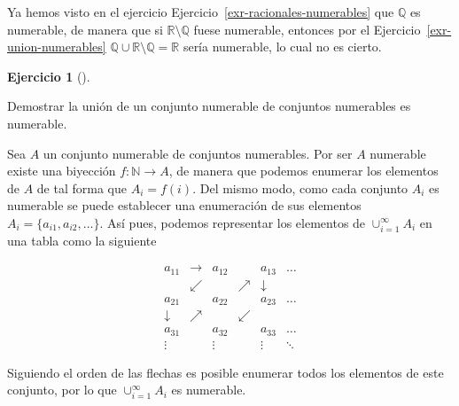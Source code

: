 \documentclass[
  spanish,
  a4paper,
]{scrreport}
\theoremstyle{definition}
\newtheorem{exercise}{Ejercicio}[chapter]
\theoremstyle{remark}
\begin{document}
\begin{tcolorbox}[enhanced jigsaw, arc=.35mm, bottomrule=.15mm, bottomtitle=1mm, breakable, colback=white, colbacktitle=quarto-callout-tip-color!10!white, colframe=quarto-callout-tip-color-frame, coltitle=black, left=2mm, leftrule=.75mm, opacityback=0, opacitybacktitle=0.6, rightrule=.15mm, title=\textcolor{quarto-callout-tip-color}{\faLightbulb}\hspace{0.5em}{Solución}, titlerule=0mm, toprule=.15mm, toptitle=1mm]

Ya hemos visto en el ejercicio Ejercicio~\ref{exr-racionales-numerables}
que \(\mathbb{Q}\) es numerable, de manera que si
\(\mathbb{R}\setminus \mathbb{Q}\) fuese numerable, entonces por el
Ejercicio~\ref{exr-union-numerables}
\(\mathbb{Q}\cup \mathbb{R}\setminus \mathbb{Q}=\mathbb{R}\) sería
numerable, lo cual no es cierto.

\end{tcolorbox}

\begin{exercise}[]\protect\hypertarget{exr-union-numerable-conjuntos-numerables}{}\label{exr-union-numerable-conjuntos-numerables}

Demostrar la unión de un conjunto numerable de conjuntos numerables es
numerable.

\end{exercise}

\begin{tcolorbox}[enhanced jigsaw, arc=.35mm, bottomrule=.15mm, bottomtitle=1mm, breakable, colback=white, colbacktitle=quarto-callout-tip-color!10!white, colframe=quarto-callout-tip-color-frame, coltitle=black, left=2mm, leftrule=.75mm, opacityback=0, opacitybacktitle=0.6, rightrule=.15mm, title=\textcolor{quarto-callout-tip-color}{\faLightbulb}\hspace{0.5em}{Solución}, titlerule=0mm, toprule=.15mm, toptitle=1mm]

Sea \(A\) un conjunto numerable de conjuntos numerables. Por ser \(A\)
numerable existe una biyección \(f:\mathbb{N}\to A\), de manera que
podemos enumerar los elementos de \(A\) de tal forma que \(A_i=f(i)\).
Del mismo modo, como cada conjunto \(A_i\) es numerable se puede
establecer una enumeración de sus elementos
\(A_i=\{a_{i1},a_{i2},\ldots\}\). Así pues, podemos representar los
elementos de \(\cup_{i=1}^\infty A_i\) en una tabla como la siguiente

\[
\begin{array}{cccccc}
a_{11} & \rightarrow & a_{12} & & a_{13} & \ldots \\
& \swarrow & & \nearrow & \downarrow \\
a_{21} & & a_{22} & & a_{23} & \ldots \\
\downarrow & \nearrow & & \swarrow \\
a_{31} & & a_{32} & & a_{33} & \ldots \\
\vdots & & \vdots & & \vdots & \ddots
\end{array}
\]

Siguiendo el orden de las flechas es posible enumerar todos los
elementos de este conjunto, por lo que \(\cup_{i=1}^\infty A_i\) es
numerable.

\end{tcolorbox}
\end{document}
